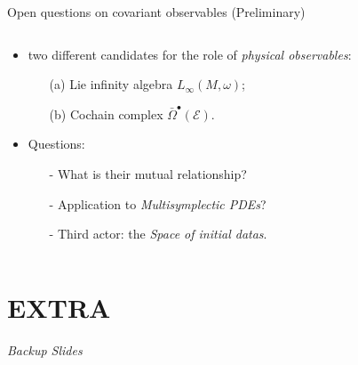 \documentclass[handout,10pt]{beamer}
\begin{document}
\begin{frame}{Open questions on covariant observables (Preliminary)}
\begin{columns}
\begin{column}{.50\linewidth}
\begin{itemize}
				\item<3-> two different candidates for the role of \emph{physical observables}:
					\begin{itemize}
						\item[(a)] Lie infinity algebra $L_\infty (M,\omega)$;
						\item[(b)] Cochain complex $\bar{\Omega}^\bullet(\mathcal{E})$.
					\end{itemize}
				\item<4-> Questions:
					\begin{itemize}
						\item[-] What is their mutual relationship?
						\item[-] Application to \emph{Multisymplectic PDEs}?
						\item[-] Third actor: the \emph{Space of initial datas}.
					\end{itemize}																		
			\end{itemize}
		\end{column}
	\end{columns}
\end{frame}




  
\appendix
\section{EXTRA}
\begin{frame}
	\begin{center}
	\Huge\emph{Backup Slides}
	\end{center}
\end{frame}
\addtocounter{framenumber}{-1}

%
\end{document}
